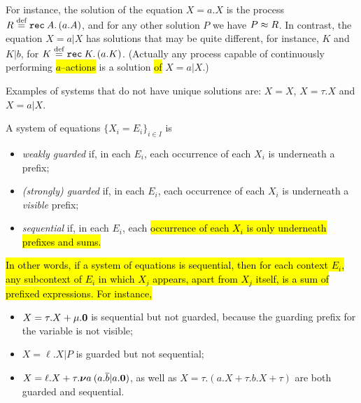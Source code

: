 For instance, the solution of the equation $X = a. X$ 
is the process
$R \stackrel{\mbox{\scriptsize def}}{=} {\tt rec}\: A . \, (a. A)$, and for any other solution $P$ we have $P \approx R$.
In contrast, the equation 
 $X = a|  X$ has solutions that may be quite different, for instance,
 $K$ and $K | b$, for $K \stackrel{\mbox{\scriptsize def}}{=} {\tt rec}\: K . \, (a. K)$. (Actually any process capable of
continuously performing \hl{$a$--actions} is a solution \hl{of} $X = a|  X$.)

%
%
Examples of systems that do not have unique solutions are: $X = X$, $X
= \tau . X$ and $X = a | X$.

\begin{definition}
\label{def:guardness}
A system of equations $\{ X_i = E_i\}_{i\in I}$ is 
\begin{itemize}
\item \emph{weakly guarded} if, in each $E_i$, each occurrence of
  each $X_i$ is underneath a prefix;

\item \emph{(strongly) guarded} if, in each $E_i$, each occurrence of
  each $X_i$ is underneath a \emph{visible} prefix;

\item \emph{sequential} if, in each $E_i$, each
  \hl{occurrence of each $X_i$ is only underneath prefixes and sums.}
\end{itemize}
\end{definition}

\hl{In other words, if a system of equations is sequential, then for
each context $E_i$, any subcontext of $E_i$ in which $X_j $
appears, apart from $X_j$ itself, is a sum of prefixed expressions.
For instance,}
\begin{itemize}
\item $X = \tau. X + \mu . {\boldsymbol 0}$ is sequential but not 
 guarded, because the guarding prefix for the variable
is not visible;
\item $X =  \ell . X | P$ is guarded but not sequential;
\item $X =  \ell . X + \tau. {\boldsymbol \nu} a\: (a .\overline{b} | a.{\boldsymbol 0})$, as well as
$X = \tau . (a. X + \tau . b .X + \tau  )$ are both guarded and sequential.
\end{itemize}

